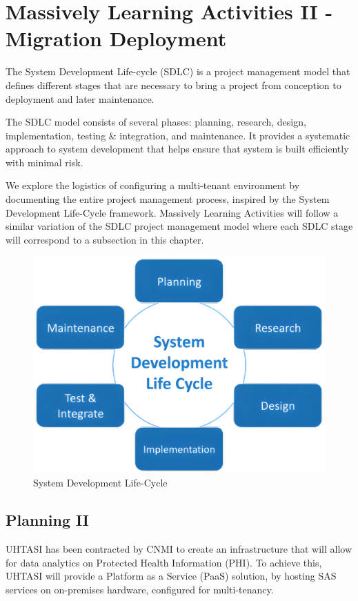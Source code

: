 \section{Massively Learning Activities II - Migration Deployment} \label{section: MLA2}
The System Development Life-cycle (SDLC) is a project management model that defines different stages that are necessary to bring a project from conception to deployment and later maintenance. 

The SDLC model consists of several phases: planning, research, design, implementation, testing \& integration, and maintenance. It provides a systematic approach to system development that helps ensure that system is built efficiently with minimal risk.

We explore the logistics of configuring a multi-tenant environment by documenting the entire project management process, inspired by the System Development Life-Cycle framework.  Massively Learning Activities will follow a similar variation of the SDLC project management model where each SDLC stage will correspond to a subsection in this chapter. 

\begin{figure}[H]
    \centering
    \includegraphics[scale = 0.175]{images/SDLC.png}
    \caption{System Development Life-Cycle}
    \label{SDLCII}
\end{figure} 

\subsection{Planning II}
UHTASI has been contracted by CNMI to create an infrastructure that will allow for data analytics on Protected Health Information (PHI). To achieve this, UHTASI will provide a Platform as a Service (PaaS) solution, by hosting SAS services on on-premises hardware, configured for multi-tenancy.

